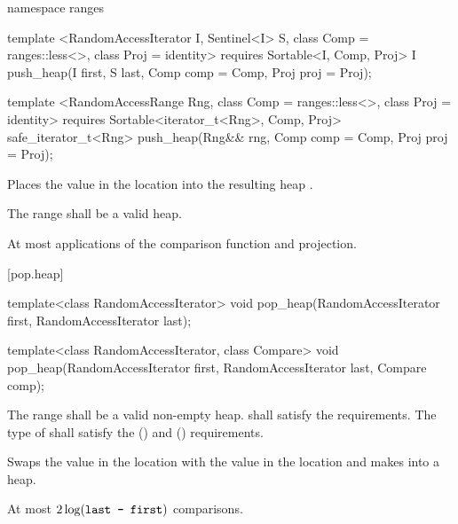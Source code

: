 \begin{addedblock}
%
\begin{itemdecl}
namespace ranges {
  template <RandomAccessIterator I, Sentinel<I> S, class Comp = ranges::less<>,
            class Proj = identity>
      requires Sortable<I, Comp, Proj>
    I push_heap(I first, S last, Comp comp = Comp{}, Proj proj = Proj{});

  template <RandomAccessRange Rng, class Comp = ranges::less<>, class Proj = identity>
      requires Sortable<iterator_t<Rng>, Comp, Proj>
    safe_iterator_t<Rng> push_heap(Rng&& rng, Comp comp = Comp{}, Proj proj = Proj{});
}
\end{itemdecl}

\begin{itemdescr}
\pnum
\effects
Places the value in the location
into the resulting heap
.

\pnum
\requires
The range
shall be a valid heap.

\pnum
\returns {}

\pnum
\complexity
At most
applications of the comparison function and projection.
\end{itemdescr}
\end{addedblock}

[pop.heap]{}

%
\begin{itemdecl}
template<class RandomAccessIterator>
  void pop_heap(RandomAccessIterator first, RandomAccessIterator last);

template<class RandomAccessIterator, class Compare>
  void pop_heap(RandomAccessIterator first, RandomAccessIterator last,
                Compare comp);
\end{itemdecl}

\begin{itemdescr}
\pnum
\requires
The range
shall be a valid non-empty heap.
 shall satisfy the
 requirements. The type
of  shall satisfy the
 () and
 () requirements.

\pnum
\effects
Swaps the value in the location 
with the value in the location
and makes
into a heap.

\pnum
\complexity
At most
$2 \log(\texttt{last - first})$
comparisons.
\end{itemdescr}

